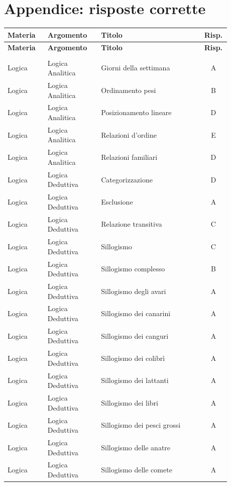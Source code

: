 \documentclass[20pt, a4paper]{article}
\begin{document}
\section*{Appendice: risposte corrette}
\begin{longtable}{@{}>{\raggedright\arraybackslash}p{0.18\linewidth}>{\raggedright\arraybackslash}p{0.24\linewidth}>{\raggedright\arraybackslash}p{0.46\linewidth}c@{}}
\toprule
\textbf{Materia} & \textbf{Argomento} & \textbf{Titolo} & \textbf{Risp.} \\
\midrule
\endfirsthead
\toprule
\textbf{Materia} & \textbf{Argomento} & \textbf{Titolo} & \textbf{Risp.} \\
\midrule
\endhead
\midrule
\multicolumn{4}{r}{\footnotesize\textit{Continua}} \\
\endfoot
\bottomrule
\endlastfoot
Logica & Logica Analitica & Giorni della settimana & A \\
Logica & Logica Analitica & Ordinamento pesi & B \\
Logica & Logica Analitica & Posizionamento lineare & D \\
Logica & Logica Analitica & Relazioni d'ordine & E \\
Logica & Logica Analitica & Relazioni familiari & D \\
Logica & Logica Deduttiva & Categorizzazione & D \\
Logica & Logica Deduttiva & Esclusione & A \\
Logica & Logica Deduttiva & Relazione transitiva & C \\
Logica & Logica Deduttiva & Sillogismo & C \\
Logica & Logica Deduttiva & Sillogismo complesso & B \\
Logica & Logica Deduttiva & Sillogismo degli avari & A \\
Logica & Logica Deduttiva & Sillogismo dei canarini & A \\
Logica & Logica Deduttiva & Sillogismo dei canguri & A \\
Logica & Logica Deduttiva & Sillogismo dei colibrì & A \\
Logica & Logica Deduttiva & Sillogismo dei lattanti & A \\
Logica & Logica Deduttiva & Sillogismo dei libri & A \\
Logica & Logica Deduttiva & Sillogismo dei pesci grossi & A \\
Logica & Logica Deduttiva & Sillogismo delle anatre & A \\
Logica & Logica Deduttiva & Sillogismo delle comete & A \\

\end{longtable}
\end{document}
